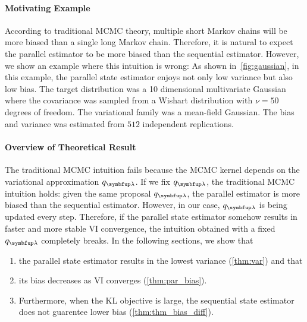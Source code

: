 \paragraph{Motivating Example}
According to traditional MCMC theory, multiple short Markov chains will be more biased than a single long Markov chain.
Therefore, it is natural to expect the parallel estimator to be more biased than the sequential estimator.
However, we show an example where this intuition is wrong: As shown in~\cref{fig:gaussian}, in this example, the parallel state estimator enjoys not only low variance but also low bias.
The target distribution was a 10 dimensional multivariate Gaussian where the covariance was sampled from a Wishart distribution with \(\nu = 50\) degrees of freedom.
The variational family was a mean-field Gaussian.
The bias and variance was estimated from \(512\) independent replications.

\vspace{-0.05in}
\paragraph{Overview of Theoretical Result}
The traditional MCMC intuition fails because the MCMC kernel depends on the variational approximation \(q_{\vlambda}\).
If we fix \(q_{\vlambda}\), the traditional MCMC intuition holds: given the same proposal \(q_{\vlambda}\), the parallel estimator is more biased than the sequential estimator.
However, in our case, \(q_{\vlambda}\) is being updated every step.
Therefore, if the parallel state estimator somehow results in faster and more stable VI convergence, the intuition obtained with a fixed \(q_{\vlambda}\) completely breaks.
In the following sections, we show that 
\vspace{-0.05in}
\begin{enumerate}[noitemsep]
  \item[\ding{182}] the parallel state estimator results in the lowest variance (\cref{thm:var}) and that
  \item[\ding{183}] its bias decreases as VI converges (\cref{thm:par_bias}).
  \item[\ding{184}] %
    Furthermore, when the KL objective is large, the sequential state estimator does not guarentee lower bias (\cref{thm:thm_bias_diff}).
\end{enumerate}
\vspace{-0.05in}

